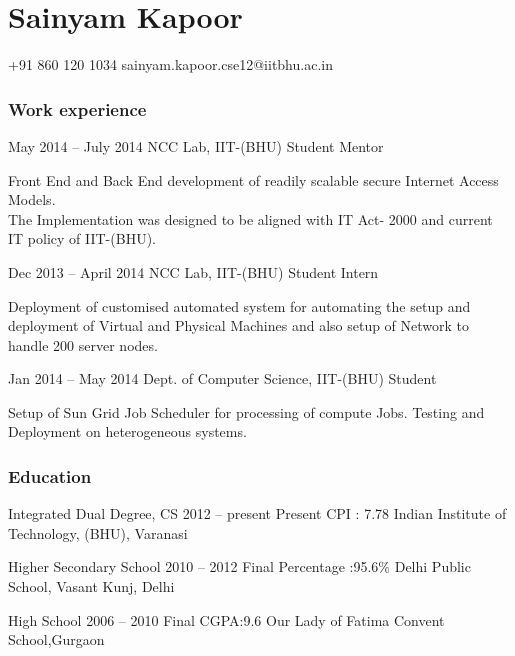 \documentclass{tccv}
\begin{document}
\part{Sainyam Kapoor}

    {+91 860 120 1034}
    {sainyam.kapoor.cse12@iitbhu.ac.in}
\section{Work experience}

\begin{eventlist}

\item{May 2014 -- July 2014}
     {NCC Lab, IIT-(BHU)}
     {Student Mentor}

Front End and Back End development of readily scalable secure Internet Access Models.\\The Implementation was designed to be
aligned with IT Act- 2000 and current IT policy of IIT-(BHU).

\item{Dec 2013 -- April 2014}
     {NCC Lab, IIT-(BHU)}
     {Student Intern}

Deployment of customised automated system for automating the setup and deployment of Virtual and Physical Machines and also setup of Network to handle 200 server nodes.

\item{Jan 2014 -- May 2014}
     {Dept. of Computer Science, IIT-(BHU)}
     {Student}

Setup of Sun Grid Job Scheduler for processing of compute Jobs. Testing and Deployment on heterogeneous systems.
\end{eventlist}


\section{Education}

\begin{yearlist}

\item[ Integrated Dual Degree, CS]{2012 -- present}
     {Present CPI : 7.78}
     {Indian Institute of Technology, (BHU), Varanasi}
     
\item[ Higher Secondary School]{2010 -- 2012}
     {Final Percentage :95.6\%}
     {Delhi Public School, Vasant Kunj, Delhi}

\item[ High School ]{2006 -- 2010}
     {Final CGPA:9.6}
     {Our Lady of Fatima Convent School,Gurgaon}

\end{yearlist}
\end{document}
